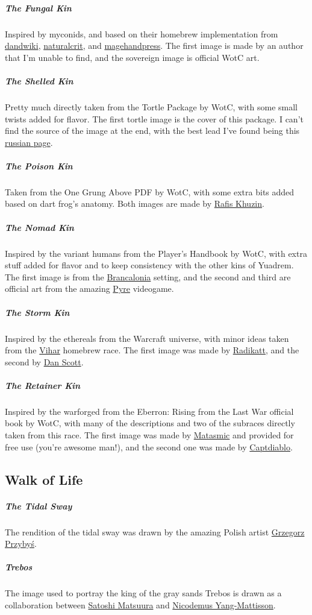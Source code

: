     \subparagraph{The Fungal Kin} Inspired by myconids, and based on their homebrew implementation from \href{https://www.dandwiki.com/wiki/Myconid_(5e_Race)}{dandwiki}, \href{https://www.reddit.com/r/UnearthedArcana/comments/5269hx/race_myconid/}{naturalcrit}, and \href{https://mfov.magehandpress.com/2015/09/myconids.html}{magehandpress}.
    The first image is made by an author that I'm unable to find, and the sovereign image is official WotC art.

    \subparagraph{The Shelled Kin} Pretty much directly taken from the Tortle Package by WotC, with some small twists added for flavor.
    The first tortle image is the cover of this package.
    I can't find the source of the image at the end, with the best lead I've found being this \href{https://avatarko.ru/kartinka/30751}{russian page}.

    \subparagraph{The Poison Kin} Taken from the One Grung Above PDF by WotC, with some extra bits added based on dart frog's anatomy.
    Both images are made by \href{https://www.artstation.com/rafis}{Rafis Khuzin}.

    \subparagraph{The Nomad Kin} Inspired by the variant humans from the Player's Handbook by WotC, with extra stuff added for flavor and to keep consistency with the other kins of Yuadrem.
    The first image is from the \href{https://www.kickstarter.com/projects/acherongames/brancalonia-the-spaghetti-fantasy-rpg?lang=es}{Brancalonia} setting, and the second and third are official art from the amazing \href{https://www.supergiantgames.com/games/pyre/}{Pyre} videogame.

    \subparagraph{The Storm Kin} Inspired by the ethereals from the Warcraft universe, with minor ideas taken from the \href{https://www.dandwiki.com/wiki/Vihar_(5e_Race)}{Vihar} homebrew race.
    The first image was made by \href{https://radikatt.tumblr.com/}{Radikatt}, and the second by \href{https://twitter.com/danscottart}{Dan Scott}.

    \subparagraph{The Retainer Kin} Inspired by the warforged from the Eberron: Rising from the Last War official book by WotC, with many of the descriptions and two of the subraces directly taken from this race.
    The first image was made by \href{https://www.reddit.com/user/Matasmic/}{Matasmic} and provided for free use (you're awesome man!), and the second one was made by \href{https://www.reddit.com/user/captdiablo/}{Captdiablo}.

\subsection*{Walk of Life}
    \subparagraph{The Tidal Sway} The rendition of the tidal sway was drawn by the amazing Polish artist \href{https://grzegorzprzybys.artstation.com/}{Grzegorz Przybyś}.

    \subparagraph{Trebos} The image used to portray the king of the gray sands Trebos is drawn as a collaboration between \href{https://www.artstation.com/hiziripro}{Satoshi Matsuura} and \href{https://www.artstation.com/nicodemus}{Nicodemus Yang-Mattisson}.
